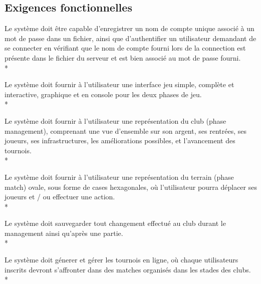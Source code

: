 \documentclass[a4paper]{article}
\begin{document}
	\subsection{Exigences fonctionnelles}
		\begin{description}[style=nextline]
			\item[Vérification d'authentification :]Le système doit être capable d'enregistrer un nom de compte unique associé à un mot de passe dans un fichier, ainsi que d'authentifier un utilisateur demandant de se connecter en vérifiant que le nom de compte fourni lors de la connection est présente dans le fichier du serveur et est bien associé au mot de passe fourni.\\*
			\item[Interface :]Le système doit fournir à l'utilisateur une interface jeu simple, complète et interactive, graphique et en console pour les deux phases de jeu.\\*
			\item[Représentation phase management :]Le système doit fournir à l'utilisateur une représentation du \gls{club} (phase management), comprenant une vue d'ensemble sur son argent, ses rentrées, ses joueurs, ses infrastructures, les améliorations possibles, et l'avancement des tournois.\\*
			\item[Représentation phase match :]Le système doit fournir à l'utilisateur une représentation du terrain (phase match) ovale, sous forme de cases hexagonales, où l'utilisateur pourra déplacer ses joueurs et / ou effectuer une action.\\*
			\item[Sauvegarde :]Le système doit sauvegarder tout changement effectué au \gls{club} durant le management ainsi qu'après une partie.\\*
			\item[Tournois :]Le système doit génerer et gérer les tournois en ligne, où chaque utilisateurs inscrits devront s'affronter dans des matches organisés dans les stades des clubs.\\*
		\end{description}
\end{document}
